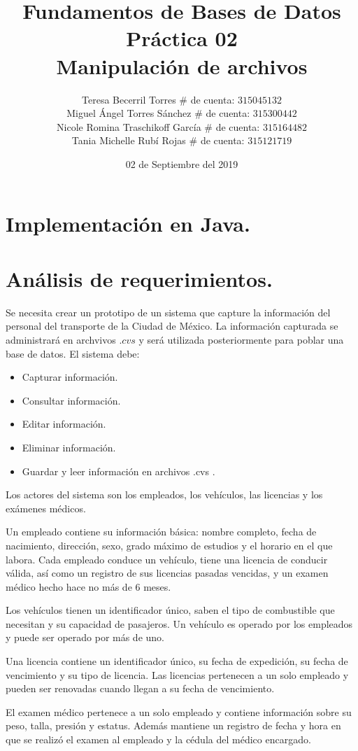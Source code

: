 \documentclass[letterpaper,12pt]{article}
\title{Fundamentos de Bases de Datos \\
       Práctica 02 \\
       Manipulación de archivos}
\author{Teresa Becerril Torres
        $\#$ de cuenta: $315045132$ \\
        Miguel Ángel Torres Sánchez
        $\#$ de cuenta: $315300442$ \\
        Nicole Romina Traschikoff García
        $\#$ de cuenta: $315164482$ \\
        Tania Michelle Rubí Rojas
        $\#$ de cuenta: $315121719$}
\date{02 de Septiembre del 2019}
\begin{document}
\maketitle

\section{Implementación en Java.}

\section{Análisis de requerimientos.}

Se necesita crear un prototipo de un sistema que capture la información del 
personal del transporte de la Ciudad de México. La información capturada se 
administrará en archvivos $.cvs$ y será utilizada posteriormente para poblar 
una base de datos. El sistema debe:

\begin{itemize}
    \item Capturar información.
	\item Consultar información.
	\item Editar información.
	\item Eliminar información.
	\item Guardar y leer información en archivos .cvs .
\end{itemize}

Los actores del sistema son los empleados, los vehículos, las licencias y los 
exámenes médicos.

Un empleado contiene su información básica: nombre completo, fecha de 
nacimiento, dirección, sexo, grado máximo de estudios y el horario en el que 
labora. Cada empleado conduce un vehículo, tiene una licencia de conducir 
válida, así como un registro de sus licencias pasadas vencidas, y un examen 
médico hecho hace no más de 6 meses.

Los vehículos tienen un identificador único, saben el tipo de combustible que 
necesitan y su capacidad de pasajeros. Un vehículo es operado por los 
empleados y puede ser operado por más de uno.

Una licencia contiene un identificador único, su fecha de expedición, su fecha 
de vencimiento y su tipo de licencia. Las licencias pertenecen a un solo 
empleado y pueden ser renovadas cuando llegan a su fecha de vencimiento.

El examen médico pertenece a un solo empleado y contiene información sobre 
su peso, talla, presión y estatus. Además mantiene un registro de fecha y 
hora en que se realizó el examen al empleado y la cédula del médico encargado.
\end{document}
